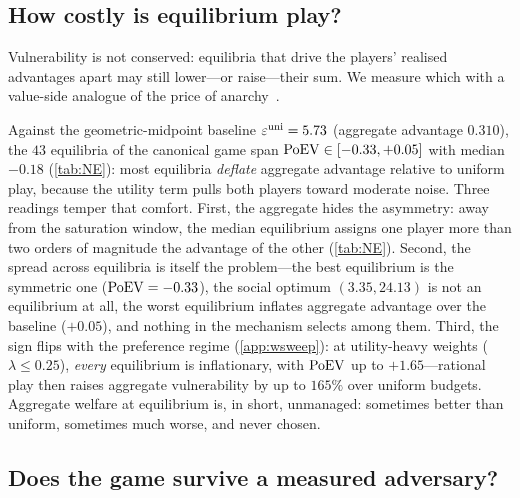 \subsection{How costly is equilibrium play?}
\label{sec:poev}

Vulnerability is not conserved: equilibria that drive the players'
realised advantages apart may still lower---or raise---their sum. We
measure which with a value-side analogue of the price of
anarchy~\cite{koutsoupias1999worst}.


Against the geometric-midpoint baseline $\varepsilon^{\mathrm{uni}} = 5.73$
(aggregate advantage $0.310$), the $43$ equilibria of the canonical
game span $\mathrm{PoEV} \in [-0.33, +0.05]$ with median $-0.18$
(\cref{tab:NE}): most equilibria \emph{deflate} aggregate advantage
relative to uniform play, because the utility term pulls both players
toward moderate noise. Three readings temper that comfort. First,
the aggregate hides the asymmetry: away from the saturation window,
the median equilibrium assigns one player more than two orders of
magnitude the advantage of the other (\cref{tab:NE}). Second, the
spread across equilibria is itself the problem---the best
equilibrium is the symmetric one ($\mathrm{PoEV} = -0.33$), the social
optimum $(3.35, 24.13)$ is not an equilibrium at all, the worst
equilibrium inflates aggregate advantage over the baseline
($+0.05$), and nothing in the mechanism selects among them. Third,
the sign flips with the preference regime (\cref{app:wsweep}): at
utility-heavy weights ($\lambda \le 0.25$), \emph{every} equilibrium
is inflationary, with $\mathrm{PoEV}$ up to $+1.65$---rational play then
raises aggregate vulnerability by up to $165\%$ over uniform
budgets. Aggregate welfare at equilibrium is, in short, unmanaged:
sometimes better than uniform, sometimes much worse, and never
chosen.

\subsection{Does the game survive a measured adversary?}
\label{sec:H1}

